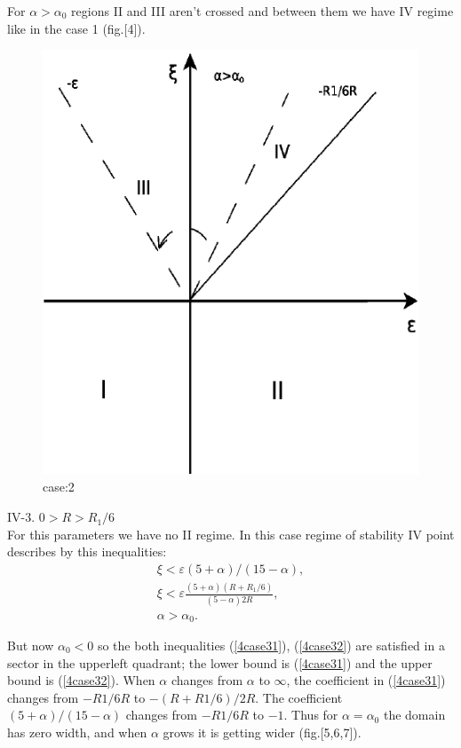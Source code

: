 \documentclass[12pt]{article}
\begin{document}
For $\alpha>\alpha_0$ regions II and III aren't crossed and between them we have IV regime like in the case 1 (fig.[4]).

\begin{figure}
 \includegraphics{./Diagram5.pdf}
 \caption{case:2}
 \label{fig:4}
\end{figure}

IV-3. $0>R>R_1/6$ \\
For this parameters we have no II regime.
In this case regime of stability IV point describes by this inequalities:
\begin{eqnarray}
\xi<\varepsilon(5+\alpha)/(15-\alpha),
\label{4case31}
 \\
 \xi<\varepsilon\frac{(5+\alpha)(R+R_1/6)}{(5-\alpha)2R},
\label{4case32}
\\
\alpha>\alpha_0.
\label{4case33}
\end{eqnarray}

But now $\alpha_0<0$ so the both inequalities (\ref{4case31}), (\ref{4case32}) are satisfied in a sector in the upperleft quadrant;
the lower bound is (\ref{4case31}) and the upper bound is (\ref{4case32}).
When $\alpha$ changes from $\alpha$ to $\infty$, the coefficient
in (\ref{4case31}) changes from $−R1/6R$ to $−(R + R1 /6)/2R$. The coefficient $(5+\alpha)/(15-\alpha)$ changes from $−R1/6R$ to $−1$. Thus for
$\alpha=\alpha_0$ the domain has zero width, and when $\alpha$ grows it is getting wider (fig.[5,6,7]).
\end{document}
